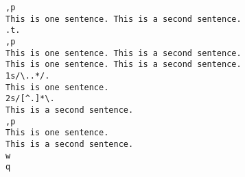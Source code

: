 \documentclass[12pt]{article}
\begin{document}
\begin{lstlisting}
,p
This is one sentence. This is a second sentence.
.t.
,p
This is one sentence. This is a second sentence.
This is one sentence. This is a second sentence.
1s/\..*/.
This is one sentence.
2s/[^.]*\. 
This is a second sentence.
,p
This is one sentence.
This is a second sentence.
w
q
\end{lstlisting}





\end{document}
